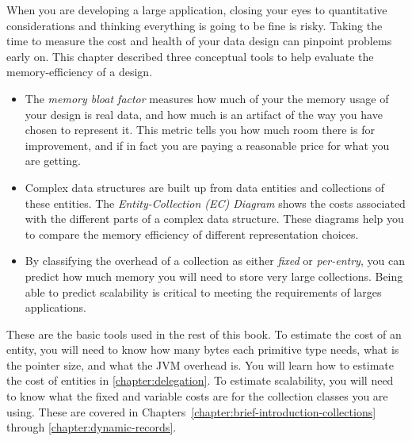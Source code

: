 When you are developing a large application, closing your eyes to quantitative
considerations and thinking everything is going to be fine is risky. Taking the
time to measure the cost and health of your data design can pinpoint problems
early on. This chapter described three conceptual tools to help evaluate the
memory-efficiency of a design.
\begin{itemize}
\item The \textsl{memory bloat factor} measures how much of your the memory
usage of your design is real data, and how much is an artifact of the way you
have chosen to represent it. This metric tells you how much room there is for
improvement, and if in fact you are paying a reasonable price for what you are
getting.
\item Complex data structures are built up from data entities and collections of
these entities.  The \textsl{Entity-Collection (EC) Diagram} shows the costs
associated with the different parts of a complex data structure. These diagrams
help you to compare the memory efficiency of different representation choices.
\item By classifying the overhead of a collection as either \textsl{fixed} or
\textsl{per-entry}, you can predict how much memory you will need to store very
large collections. Being able to predict scalability is critical to meeting the
requirements of larges applications.
\end{itemize}
These are the basic tools used in the rest of this book. To estimate the cost of
an entity, you will need to know how many bytes each primitive type needs, what
is the pointer size, and what the JVM overhead is. You will learn how to
estimate the cost of entities in \autoref{chapter:delegation}. To estimate scalability,
you will need to know what the fixed and variable costs are for the collection classes
you are using. These are covered in Chapters~\ref{chapter:brief-introduction-collections}
through \ref{chapter:dynamic-records}.

